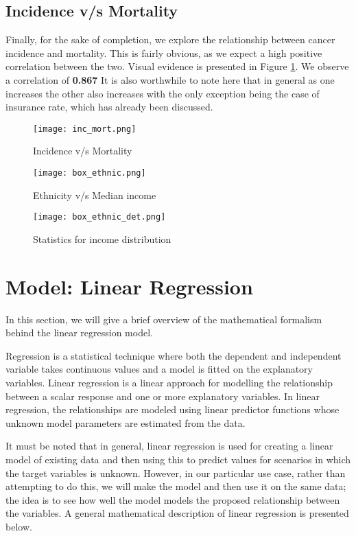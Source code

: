 \documentclass[conference]{IEEEtran}
\begin{document}
\subsection{Incidence v/s Mortality}

Finally, for the sake of completion, we explore the relationship between cancer incidence and mortality. This is fairly obvious, as we expect a high positive correlation between the two. Visual evidence is presented in Figure \ref{inc_mort}. We observe a correlation of \textbf{0.867} It is also worthwhile to note here that in general as one increases the other also increases with the only exception being the case of insurance rate, which has already been discussed.  

\begin{figure}[tbh]
    \centering
    \texttt{[image: inc\_mort.png]}
    \caption{Incidence v/s Mortality}
    \label{inc_mort}
\end{figure}

\begin{figure*}
\centering
\texttt{[image: box\_ethnic.png]}
\caption{Ethnicity v/s Median income}
\label{box_ethnic}
\end{figure*}

\begin{figure*}
\centering
\texttt{[image: box\_ethnic\_det.png]}
\caption{Statistics for income distribution}
\label{box_ethnic_det}
\end{figure*}


\section{Model: Linear Regression}

In this section, we will give a brief overview of the mathematical formalism behind the linear regression model. 

Regression is a statistical technique where both the dependent and independent variable takes continuous values and a model is fitted on the explanatory variables. Linear regression is a linear approach for modelling the relationship between a scalar response and one or more explanatory variables. In linear regression, the relationships are modeled using linear predictor functions whose unknown model parameters are estimated from the data.

It must be noted that in general, linear regression is used for creating a linear model of existing data and then using this to predict values for scenarios in which the target variables is unknown. However, in our particular use case, rather than attempting to do this, we will make the model and then use it on the same data; the idea is to see how well the model models the proposed relationship between the variables. A general mathematical description of linear regression is presented below.
\end{document}
